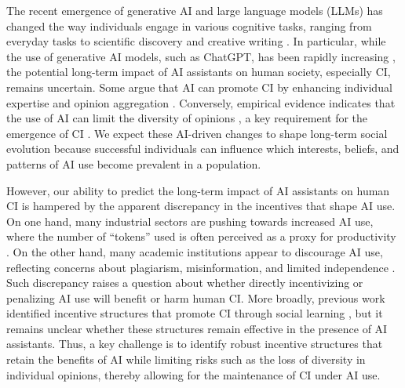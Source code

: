 \documentclass[12pt]{article}
\begin{document}
The recent emergence of generative AI and large language models (LLMs) has changed the way individuals engage in various cognitive tasks, ranging from everyday tasks \citep{noy2023experimental,brynjolfsson2025generative} to scientific discovery \citep{lu2026towards} and creative writing \citep{doshi2024generative}.
In particular, while the use of generative AI models, such as ChatGPT, has been rapidly increasing \citep{bick2026rapid,sajadieh2026artificial}, the potential long-term impact of AI assistants on human society, especially CI, remains uncertain.
Some argue that AI can promote CI by enhancing individual expertise \citep{vaccaro2024combinations} and opinion aggregation \citep{burton2024large,tessler2024ai}.
Conversely, empirical evidence indicates that the use of AI can limit the diversity of opinions \citep{fugener2021will,doshi2024generative,lee2024empirical,meincke2025chatgpt}, a key requirement for the emergence of CI \citep{hong2004groups,lorenz2011social,aplin2014individual,becker2017network}.
We expect these AI-driven changes to shape long-term social evolution because successful individuals can influence which interests, beliefs, and patterns of AI use become prevalent in a population.

However, our ability to predict the long-term impact of AI assistants on human CI is hampered by the apparent discrepancy in the incentives that shape AI use.
On one hand, many industrial sectors are pushing towards increased AI use, where the number of ``tokens'' used is often perceived as a proxy for productivity \citep{bousquette2026tokenmaxxing,keary2026cult}.
On the other hand, many academic institutions appear to discourage AI use, reflecting concerns about plagiarism, misinformation, and limited independence \citep{thorp2023chatgpt,chawla2026researchers}.
Such discrepancy raises a question about whether directly incentivizing or penalizing AI use will benefit or harm human CI.
More broadly, previous work identified incentive structures that promote CI through social learning  \citep{wang2025individual}, but it remains unclear whether these structures remain effective in the presence of AI assistants.
Thus, a key challenge is to identify robust incentive structures that retain the benefits of AI while limiting risks such as the loss of diversity in individual opinions, thereby allowing for the maintenance of CI under AI use.
\end{document}
